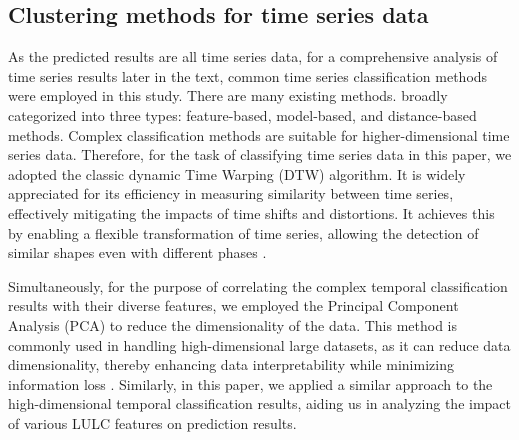 \documentclass[a4paper,fleqn]{cas-sc}
\begin{document}

\subsection{Clustering methods for time series data}

As the predicted results are all time series data, for a comprehensive analysis of time series results later in the text, common time series classification methods were employed in this study. There are many existing methods. \cite{abanda2019review} broadly categorized into three types: feature-based, model-based, and distance-based methods. Complex classification methods are suitable for higher-dimensional time series data. Therefore, for the task of classifying time series data in this paper, we adopted the classic dynamic Time Warping (DTW) algorithm. It is widely appreciated for its efficiency in measuring similarity between time series, effectively mitigating the impacts of time shifts and distortions. It achieves this by enabling a flexible transformation of time series, allowing the detection of similar shapes even with different phases \citep{senin2008dynamic}. 

Simultaneously, for the purpose of correlating the complex temporal classification results with their diverse features, we employed the 
Principal Component Analysis (PCA) \citep{mackiewicz1993principal} to reduce the dimensionality of the data. This method is commonly used in handling high-dimensional large datasets, as it can reduce data dimensionality, thereby enhancing data interpretability while minimizing information loss \citep{jolliffe2016principal}. Similarly, in this paper, we applied a similar approach to the high-dimensional temporal classification results, aiding us in analyzing the impact of various LULC features on prediction results.
\end{document}
